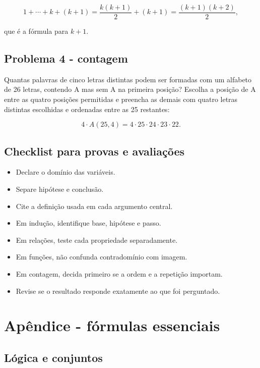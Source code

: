 \documentclass[12pt,a4paper,openany]{book}
\begin{document}
\[1+\cdots+k+(k+1)=\frac{k(k+1)}{2}+(k+1)=\frac{(k+1)(k+2)}{2},\]



que é a fórmula para $k+1$.



\section{Problema 4 - contagem}



Quantas palavras de cinco letras distintas podem ser formadas com um alfabeto de 26 letras, contendo A mas sem A na primeira posição? Escolha a posição de A entre as quatro posições permitidas e preencha as demais com quatro letras distintas escolhidas e ordenadas entre as 25 restantes:



\[4\cdot A(25,4)=4\cdot25\cdot24\cdot23\cdot22.\]



\section{Checklist para provas e avaliações}



\begin{itemize}
\item Declare o domínio das variáveis.
\item Separe hipótese e conclusão.
\item Cite a definição usada em cada argumento central.
\item Em indução, identifique base, hipótese e passo.
\item Em relações, teste cada propriedade separadamente.
\item Em funções, não confunda contradomínio com imagem.
\item Em contagem, decida primeiro se a ordem e a repetição importam.
\item Revise se o resultado responde exatamente ao que foi perguntado.
\end{itemize}



\chapter{Apêndice - fórmulas essenciais}



\section{Lógica e conjuntos}
\end{document}
